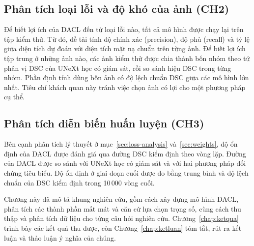 \subsection{Phân tích loại lỗi và độ khó của ảnh (CH2)}
\label{sec:analysis-rq2}

Để biết lợi ích của DACL đến từ loại lỗi nào, tất cả mô hình được chạy lại trên tập kiểm thử. Từ đó, đề tài tính độ chính xác (precision), độ phủ (recall) và tỷ lệ giữa diện tích dự đoán với diện tích mặt nạ chuẩn trên từng ảnh. Để biết lợi ích tập trung ở những ảnh nào, các ảnh kiểm thử được chia thành bốn nhóm theo tứ phân vị DSC của UNeXt học có giám sát, rồi so sánh hiệu DSC trong từng nhóm. Phần định tính dùng bốn ảnh có độ lệch chuẩn DSC giữa các mô hình lớn nhất. Tiêu chí khách quan này tránh việc chọn ảnh có lợi cho một phương pháp cụ thể.

\subsection{Phân tích diễn biến huấn luyện (CH3)}

Bên cạnh phân tích lý thuyết ở mục~\ref{sec:loss-analysis} và~\ref{sec:weights}, độ ổn định của DACL được đánh giá qua đường DSC kiểm định theo vòng lặp. Đường của DACL được so sánh với UNeXt học có giám sát và với hai phương pháp đối chứng tiêu biểu. Độ ổn định ở giai đoạn cuối được đo bằng trung bình và độ lệch chuẩn của DSC kiểm định trong 10\,000 vòng cuối.

Chương này đã mô tả khung nghiên cứu, gồm cách xây dựng mô hình DACL, phân tích các thành phần mất mát và căn cứ lựa chọn trọng số, cùng cách thu thập và phân tích dữ liệu cho từng câu hỏi nghiên cứu. Chương~\ref{chap:ketqua} trình bày các kết quả thu được, còn Chương~\ref{chap:ketluan} tóm tắt, rút ra kết luận và thảo luận ý nghĩa của chúng.
